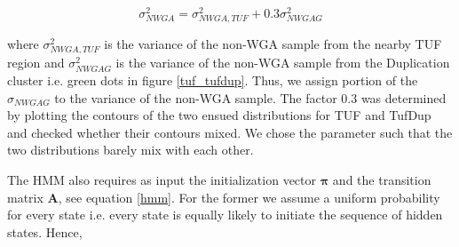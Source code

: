 \documentclass[12pt]{article}
\begin{document}
\begin{equation}
	\sigma_{NWGA}^2 = \sigma_{NWGA, TUF}^2 + 0.3 \sigma_{NWGAG}^2
	\label{equation_sigma_tufdup}
\end{equation} 

where $\sigma_{NWGA, TUF}^2$ is the variance of the non-WGA sample from the nearby TUF region and $\sigma_{NWGAG}^2$ is the variance of the non-WGA sample from the Duplication cluster i.e. green dots in figure \ref{tuf_tufdup}. Thus, we assign portion of the $\sigma_{NWGAG}$ to the variance of the non-WGA sample. The factor 0.3 was determined by plotting the contours of the two ensued distributions for TUF and TufDup and checked whether their contours mixed. We chose the parameter such that the two distributions barely mix with each other.





The HMM also requires as input the initialization vector $\boldsymbol{\pi}$ and the transition matrix $\mathbf{A}$, see equation \ref{hmm}. For the former we assume a uniform probability for every state i.e. every state is equally likely to initiate the sequence of hidden states. Hence, 
\end{document}
